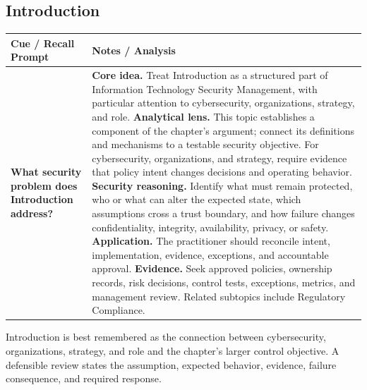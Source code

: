 \documentclass[11pt]{article}
\newcommand{\CornellHeader}{%
\rowcolor{Navy}\color{white}\bfseries Cue / Recall Prompt & \color{white}\bfseries Notes / Analysis\\\hline}
\newcommand{\CornellRow}[2]{%
\cellcolor{CueGray}\RaggedRight\textbf{#1} & \RaggedRight #2\\\hline}
\begin{document}
\subsection*{Introduction}
\begin{longtable}{>{\RaggedRight\arraybackslash}p{}|>{\RaggedRight\arraybackslash}p{}}
\CornellHeader
\CornellRow{What security problem does Introduction address?}{\textbf{Core idea.} Treat Introduction as a structured part of Information Technology Security Management, with particular attention to cybersecurity, organizations, strategy, and role. \textbf{Analytical lens.} This topic establishes a component of the chapter's argument; connect its definitions and mechanisms to a testable security objective. For cybersecurity, organizations, and strategy, require evidence that policy intent changes decisions and operating behavior. \textbf{Security reasoning.} Identify what must remain protected, who or what can alter the expected state, which assumptions cross a trust boundary, and how failure changes confidentiality, integrity, availability, privacy, or safety. \textbf{Application.} The practitioner should reconcile intent, implementation, evidence, exceptions, and accountable approval. \textbf{Evidence.} Seek approved policies, ownership records, risk decisions, control tests, exceptions, metrics, and management review. Related subtopics include Regulatory Compliance.}
\end{longtable}
\begin{topicsummary}
Introduction is best remembered as the connection between cybersecurity, organizations, strategy, and role and the chapter's larger control objective. A defensible review states the assumption, expected behavior, evidence, failure consequence, and required response.
\end{topicsummary}
\end{document}
